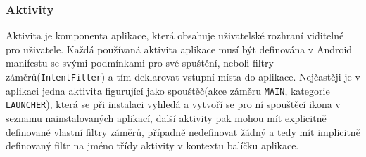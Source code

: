 \documentclass{article}
\begin{document}
\subsubsection{Aktivity}
Aktivita je komponenta aplikace, která obsahuje uživatelské rozhraní viditelné pro uživatele. Každá
 používaná aktivita aplikace musí být definována v Android manifestu se svými podmínkami pro své
 spuštění, neboli filtry záměrů(\texttt{IntentFilter}) a tím deklarovat vstupní místa do aplikace.
 Nejčastěji je v aplikaci jedna aktivita figurující jako spouštěč(akce záměru \texttt{MAIN},
 kategorie \texttt{LAUNCHER}), která se při
  instalaci vyhledá a vytvoří se pro ní spouštěcí ikona v seznamu nainstalovaných aplikací, další
  aktivity pak mohou mít explicitně definované vlastní filtry záměrů, případně nedefinovat žádný
  a tedy mít implicitně definovaný filtr na jméno třídy aktivity v kontextu balíčku aplikace.
\end{document}
